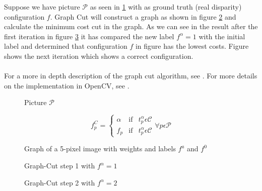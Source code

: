 \documentclass[a4paper]{article}
\begin{document}
Suppose we have picture $\mathcal{P}$ as seen in \ref{fig:pictureP} with as ground truth (real disparity) configuration $f$.
Graph Cut will construct a graph as shown in figure \ref{fig:gc_end_result} and calculate the minimum cost cut in the graph.
As we can see in the result after the first iteration in figure \ref{fig:gcstep1} it has compared the new label $f^{\alpha} = 1$ with 
the initial label and determined that configuration $f$ in figure \label{fig:gcstep1} has the lowest costs. Figure \label{fig:gcstep2} shows 
the next iteration which shows a correct configuration.\\\\

For a more in depth description of the graph cut algorithm, see
\cite{zabih2001}. For more details on the implementation in OpenCV,
see \cite{kolmogorov2003}.

\begin{figure}[h!bt]
\centering
\begin{minipage}[h]{.4\linewidth}

\end{minipage}
\hspace{.1\linewidth}
\begin{minipage}[h]{.4\linewidth}

\end{minipage}
\caption{Picture $\mathcal{P}$}
\label{fig:pictureP}
\end{figure}
\begin{equation}
 f_{p}^{C} = \left\{
  \begin{array}{lll}
  \alpha & \text{if} & t^{\alpha}_{p} \epsilon \mathcal{C} \\ 
  f_{p}  & \text{if} & t^{\alpha}_{p} \epsilon \mathcal{C}
  \end{array}
\right.
 \forall p \epsilon \mathcal{P}
\label{eq: fC}
\end{equation}

\begin{figure}[h!bt]
\centering

\caption{Graph of a 5-pixel image with weights and labels $f^a$ and $f^0$}
\label{fig:gc_end_result}
\end{figure}

\begin{figure}[h!bt]
\centering


\caption{Graph-Cut step 1 with $f^\alpha = 1$}                                             
\label{fig:gcstep1}
\end{figure}
\begin{figure}[h!bt]
\centering


\caption{Graph-Cut step 2 with $f^\alpha = 2$}
\label{fig:gcstep2}
\end{figure}
\end{document}
